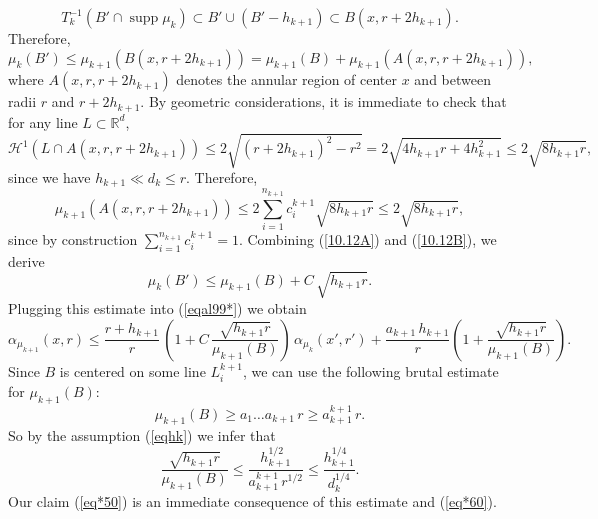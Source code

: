 \documentclass[11pt]{amsart}
\newcommand{\R}{{\mathbb R}}       %
\newcommand{\HH}{{\mathcal H}}
\newcommand{\rf}[1]{{(\ref{#1})}}
\newcommand{\supp}{\operatorname{supp}}
\newcommand{\vvv}{\vspace{4mm}}
\theoremstyle{definition}
\theoremstyle{remark}
\numberwithin{equation}{section}
\begin{document}
$$T_k^{-1}(B'\cap \supp\mu_k)\subset B'\cup (B'-h_{k+1}) \subset B(x,r+2h_{k+1}).$$
Therefore,
\begin{equation}\label{10.12A}
\mu_k(B') \leq  \mu_{k+1}(B(x,r+2h_{k+1})) = \mu_{k+1}(B) + \mu_{k+1}(A(x,r,r+2h_{k+1})),
\end{equation}
where $A(x,r,r+2h_{k+1})$ denotes the annular region of center $x$ and between radii $r$ and $r+2h_{k+1}$.
By geometric considerations, it is immediate to check that for any line $L\subset\R^d$,
$$\HH^1(L\cap A(x,r,r+2h_{k+1})) \leq 2\sqrt{(r+2h_{k+1})^2-r^2} =  2\sqrt{4h_{k+1}r + 4h_{k+1}^2}\leq 
2\sqrt{8h_{k+1}r}, 
$$
since we have $h_{k+1}\ll d_k\leq r$.
Therefore,
\begin{equation}\label{10.12B}
\mu_{k+1}(A(x,r,r+2h_{k+1}))\leq 2 \sum_{i=1}^{n_{k+1}} c_i^{k+1}\sqrt{8h_{k+1}r}\leq 2\sqrt{8h_{k+1}r},
\end{equation}
since by construction $\sum_{i=1}^{n_{k+1}} c_i^{k+1}=1$.
Combining \rf{10.12A} and \rf{10.12B}, we derive
$$\mu_k(B') \leq  \mu_{k+1}(B) + C\,\sqrt{h_{k+1}r}.$$
Plugging this estimate into \rf{eqal99*} we obtain
\begin{equation}\label{eq*60}
\alpha_{\mu_{k+1}}(x,r)\leq  \frac{r+h_{k+1}}r \,\left(1 + C\,\frac{\sqrt{h_{k+1}r}}{\mu_{k+1}(B)}
\right)\,
\alpha_{\mu_k}(x',r') + \frac{a_{k+1}\,h_{k+1}}r \left(1+\frac{\sqrt{h_{k+1}r}}{\mu_{k+1}(B)}\right).
\end{equation}
Since $B$ is centered on some line $L_i^{k+1}$, we can use the following brutal estimate for 
$\mu_{k+1}(B)$: 
$$\mu_{k+1}(B)\geq a_1\ldots a_{k+1} \,r\geq a_{k+1}^{k+1}\,r.$$
So by the assumption \rf{eqhk} we infer that
$$\frac{\sqrt{h_{k+1}r}}{\mu_{k+1}(B)}\leq \frac{h_{k+1}^{1/2}}{a_{k+1}^{k+1} \,r^{1/2}}
\leq \frac{h_{k+1}^{1/4}}{d_k^{1/4}}
.$$
Our claim \rf{eq*50} is an immediate consequence of this estimate and \rf{eq*60}.
\vvv

\end{document}
